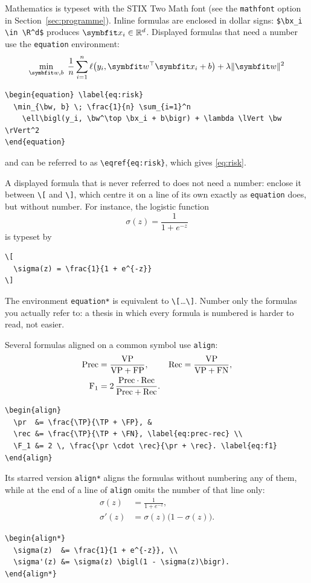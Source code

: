 Mathematics is typeset with the STIX Two Math font (see the \texttt{mathfont}
option in Section~\ref{sec:programme}). Inline formulas are
enclosed in dollar signs: \verb|$\bx_i \in \R^d$| produces
$\bx_i \in \R^d$. Displayed formulas that need a number use the
\texttt{equation} environment:
\begin{equation} \label{eq:risk}
  \min_{\bw, b} \; \frac{1}{n} \sum_{i=1}^n
    \ell\bigl(y_i, \bw^\top \bx_i + b\bigr) + \lambda \lVert \bw \rVert^2
\end{equation}
\begin{Verbatim}
\begin{equation} \label{eq:risk}
  \min_{\bw, b} \; \frac{1}{n} \sum_{i=1}^n
    \ell\bigl(y_i, \bw^\top \bx_i + b\bigr) + \lambda \lVert \bw \rVert^2
\end{equation}
\end{Verbatim}
and can be referred to as \verb|\eqref{eq:risk}|, which gives
\eqref{eq:risk}.

A displayed formula that is never referred to does not need a number:
enclose it between \verb|\[| and \verb|\]|, which centre it on a line of
its own exactly as \texttt{equation} does, but without number. For
instance, the logistic function
\[
  \sigma(z) = \frac{1}{1 + e^{-z}}
\]
is typeset by
\begin{Verbatim}
\[
  \sigma(z) = \frac{1}{1 + e^{-z}}
\]
\end{Verbatim}
The environment \texttt{equation*} is equivalent to \verb|\[|\dots\verb|\]|.
Number only the formulas you actually refer to: a thesis in which every
formula is numbered is harder to read, not easier.

Several formulas aligned on a common symbol use \texttt{align}:
\begin{align}
  \mathrm{Prec}  &= \frac{\mathrm{VP}}{\mathrm{VP} + \mathrm{FP}}, &
  \mathrm{Rec} &= \frac{\mathrm{VP}}{\mathrm{VP} + \mathrm{FN}}, \label{eq:prec-rec} \\
  \text{F}_1 &= 2 \, \frac{\mathrm{Prec} \cdot \mathrm{Rec}}{\mathrm{Prec} + \mathrm{Rec}}. \label{eq:f1}
\end{align}
\begin{Verbatim}
\begin{align}
  \pr  &= \frac{\TP}{\TP + \FP}, &
  \rec &= \frac{\TP}{\TP + \FN}, \label{eq:prec-rec} \\
  \F_1 &= 2 \, \frac{\pr \cdot \rec}{\pr + \rec}. \label{eq:f1}
\end{align}
\end{Verbatim}
Its starred version \texttt{align*} aligns the formulas without numbering
any of them, while  at the end of a line of \texttt{align} omits
the number of that line only:
\begin{align*}
  \sigma(z)  &= \frac{1}{1 + e^{-z}}, \\
  \sigma'(z) &= \sigma(z) \bigl(1 - \sigma(z)\bigr).
\end{align*}
\begin{Verbatim}
\begin{align*}
  \sigma(z)  &= \frac{1}{1 + e^{-z}}, \\
  \sigma'(z) &= \sigma(z) \bigl(1 - \sigma(z)\bigr).
\end{align*}
\end{Verbatim}

